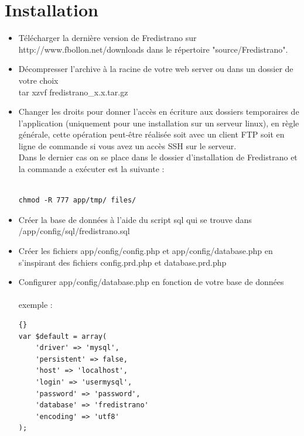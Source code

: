 \documentclass[12pt,a4paper]{report}
\begin{document}
\chapter{Installation}
\begin{itemize}
\item Télécharger la dernière version de Fredistrano sur http://www.fbollon.net/downloads dans le répertoire "source/Fredistrano".\\
\item Décompresser l'archive à la racine de votre web server ou dans un dossier de votre choix \: \\
tar xzvf fredistrano\_x.x.tar.gz \\
\item Changer les droits pour donner l'accès en écriture aux dossiers temporaires de l'application (uniquement pour une installation sur un serveur linux), en règle générale, cette opération peut-être réalisée soit avec un client FTP soit en ligne de commande si vous avez un accès SSH sur le serveur.\\
Dans le dernier cas on se place dans le dossier d'installation de Fredistrano et la commande a exécuter est la suivante :
\begin{verbatim}

chmod -R 777 app/tmp/ files/

\end{verbatim}

\item Créer la base de données à l'aide du script sql qui se trouve dans\\ /app/config/sql/fredistrano.sql\\
\item Créer les fichiers app/config/config.php et app/config/database.php en s'inspirant des fichiers config.prd.php et database.prd.php\newpage

\item Configurer app/config/database.php en fonction de votre base de données\\\\exemple :\\

\lstset{language=Php}
\lstset{commentstyle=\textit}

\begin{lstlisting}[frame=tb]{}
var $default = array(
	'driver' => 'mysql',
	'persistent' => false,
	'host' => 'localhost',
	'login' => 'usermysql',
	'password' => 'password',
	'database' => 'fredistrano'
	'encoding' => 'utf8'
);
\end{lstlisting}



\end{itemize}
\end{document}
